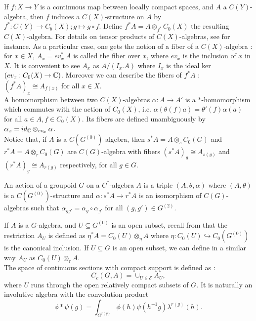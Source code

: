 If $f : X\rightarrow Y$ is a continuous map between locally compact spaces, and $A$ a $C(Y)$-algebra, then $f$ induces a $C(X)$-structure on $A$ by $f^* : C(Y) \rightarrow C_b(X); g\mapsto g\circ f$. Define $f^* A = A \otimes_{f^*} C_0(X)$ the resulting $C(X)$-algebra. For details on tensor products of $C(X)$-algebras, see \cite{LeGall} for instance. As a particular case, one gets the notion of a fiber of a $C(X)$-algebra : for $x\in X$, $A_x = ev_x^* \ A$ is called the fiber over $x$, where $ev_x$ is the inclusion of $x$ in $X$. It is convenient to see $A_x$ as $A/ (I_x .A)$ where $I_x$ is the ideal ker $(ev_x : C_0(X) \rightarrow \mathbb C)$. Moreover we can describe the fibers of $f^*A$ : $(f^*A)_x \cong A_{f(x)}$ for all $x\in X$.\\

A homomorphism between two $C(X)$-algebras $\alpha : A\rightarrow A'$ is a $*$-homomorphism which commutes with the action of $C_0(X)$, i.e. $\alpha(\theta(f)a)=\theta'(f)\alpha(a)$ for all $a\in A,f\in C_0(X)$. Its fibers are defined unambiguously by $\alpha_x = id_\mathbb C \otimes_{ev_x} \alpha$.\\

Notice that, if $A$ is a $C(G^{(0)})$-algebra, then $s^* A = A \otimes_s C_0(G)$ and $r^* A = A \otimes_r C_0(G)$ are $C(G)$-algebra with fibers $(s^*A)_g \cong A_{s(g)}$ and $(r^*A)_g \cong A_{r(g)}$ respectively, for all $g\in G$.

\begin{definition}
An action of a groupoid $G$ on a $C^*$-algebra $A$ is a triple $(A,\theta,\alpha)$ where $(A,\theta)$ is a $C(G^{(0)})$-structure and $\alpha : s^* A \rightarrow r^* A$ is an isomorphism of $C(G)$-algebras such that $\alpha_{gg'}= \alpha_g\circ \alpha_{g'}$ for all $(g,g')\in G^{(2)}$.
\end{definition} 

If $A$ is a $G$-algebra, and $U \subseteq G^{(0)}$ is an open subset, recall from \cite{LeGall} that the restriction $A_U$ is defined as $\eta^* A = C_0(U) \otimes_\eta A$ where $\eta : C_0(U) \hookrightarrow C_0(G^{(0)})$ is the canonical inclusion. If $U\subseteq G$ is an open subset, we can define in a similar way $A_U$ as $C_0(U) \otimes_r A$.\\

The space of continuous sections with compact support is defined as :
\[C_c(G,A) = \cup_{U\in \mathcal E} A_U,\]
where $U$ runs through the open relatively compact subsets of $G$. It is naturally an involutive algebra with the convolution product
\[\phi\ast \psi (g) = \int_{G^{r(g)}} \phi(h)\psi(h^{-1}g)\lambda^{r(g)}(h).\] 

